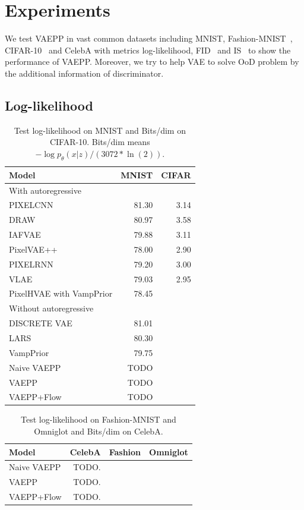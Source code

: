 \section{Experiments}
We test VAEPP in vast common datasets including MNIST, Fashion-MNIST~\cite{xiao2017/online}, CIFAR-10~\cite{krizhevsky2009learning} and CelebA with metrics log-likelihood, FID~\cite{heusel2017gans} and IS~\cite{salimans2016improved} to show the performance of VAEPP. Moreover, we try to help VAE to solve OoD problem by the additional information of discriminator. 
\subsection{Log-likelihood}
\begin{table}[tb]
\centering
\begin{tabular}{lrr}  
\toprule
Model  &  MNIST & CIFAR\\
\midrule
With autoregressive   \\
PIXELCNN         &  81.30  &  3.14   \\
DRAW             &  80.97  &  3.58    \\
IAFVAE           &  79.88  &  3.11    \\
PixelVAE++       &  78.00  &  2.90   \\
PIXELRNN         &  79.20  &  3.00    \\
VLAE             &  79.03  &  2.95     \\
PixelHVAE with VampPrior &  78.45  &     \\
\midrule
Without autoregressive   \\
DISCRETE VAE     &  81.01      \\
LARS             &  80.30     \\
VampPrior        &  79.75      \\
Naive VAEPP      &  TODO      \\
VAEPP            &  TODO      \\
VAEPP+Flow       &  TODO      \\
\bottomrule
\end{tabular}
\caption{Test log-likelihood on MNIST and Bits/dim on CIFAR-10. Bits/dim means $-\log p_\theta(x|z) / (3072 * \ln(2))$.}
\label{tab:mnist-nll}
\end{table}
\begin{table}[tb]
\centering
\begin{tabular}{lrrr}  
\toprule
Model  &  CelebA & Fashion & Omniglot \\
\midrule
Naive VAEPP           &  TODO.     \\
VAEPP                 &  TODO.     \\
VAEPP+Flow            &  TODO.     \\
\bottomrule
\end{tabular}
\caption{Test log-likelihood on Fashion-MNIST and Omniglot and Bits/dim on CelebA. }
\label{tab:cifar-nll}
\end{table}
